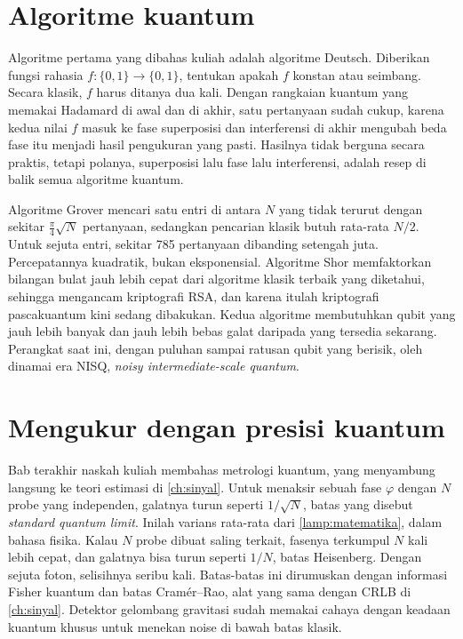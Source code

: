 \section{Algoritme kuantum}

Algoritme pertama yang dibahas kuliah adalah algoritme Deutsch. Diberikan fungsi rahasia $f:\{0,1\}\to\{0,1\}$, tentukan apakah $f$
konstan atau seimbang. Secara klasik, $f$ harus ditanya dua kali. Dengan rangkaian kuantum yang memakai Hadamard di awal dan di
akhir, satu pertanyaan sudah cukup, karena kedua nilai $f$ masuk ke fase superposisi dan interferensi di akhir mengubah beda fase itu
menjadi hasil pengukuran yang pasti. Hasilnya tidak berguna secara praktis, tetapi polanya, superposisi lalu fase lalu interferensi,
adalah resep di balik semua algoritme kuantum.

Algoritme Grover mencari satu entri di antara $N$ yang tidak terurut dengan sekitar $\tfrac\pi4\sqrt N$ pertanyaan, sedangkan pencarian
klasik butuh rata-rata $N/2$. Untuk sejuta entri, sekitar 785 pertanyaan dibanding setengah juta. Percepatannya kuadratik, bukan
eksponensial. Algoritme Shor memfaktorkan bilangan bulat jauh lebih cepat dari algoritme klasik terbaik yang diketahui, sehingga
mengancam kriptografi RSA, dan karena itulah kriptografi pascakuantum kini sedang dibakukan. Kedua algoritme membutuhkan qubit yang
jauh lebih banyak dan jauh lebih bebas galat daripada yang tersedia sekarang. Perangkat saat ini, dengan puluhan sampai ratusan qubit
yang berisik, oleh \citet{preskill2018} dinamai era NISQ, \emph{noisy intermediate-scale quantum}.

\section{Mengukur dengan presisi kuantum}

Bab terakhir naskah kuliah membahas metrologi kuantum, yang menyambung langsung ke teori estimasi di \cref{ch:sinyal}. Untuk menaksir
sebuah fase $\varphi$ dengan $N$ probe yang independen, galatnya turun seperti $1/\sqrt N$, batas yang disebut \emph{standard quantum
limit}. Inilah varians rata-rata dari \cref{lamp:matematika}, dalam bahasa fisika. Kalau $N$ probe dibuat saling terkait, fasenya
terkumpul $N$ kali lebih cepat, dan galatnya bisa turun seperti $1/N$, batas Heisenberg. Dengan sejuta foton, selisihnya seribu
kali. Batas-batas ini dirumuskan dengan informasi Fisher kuantum dan batas Cramér--Rao, alat yang sama dengan CRLB di
\cref{ch:sinyal}. Detektor gelombang gravitasi sudah memakai cahaya dengan keadaan kuantum khusus untuk menekan noise di bawah batas
klasik.

